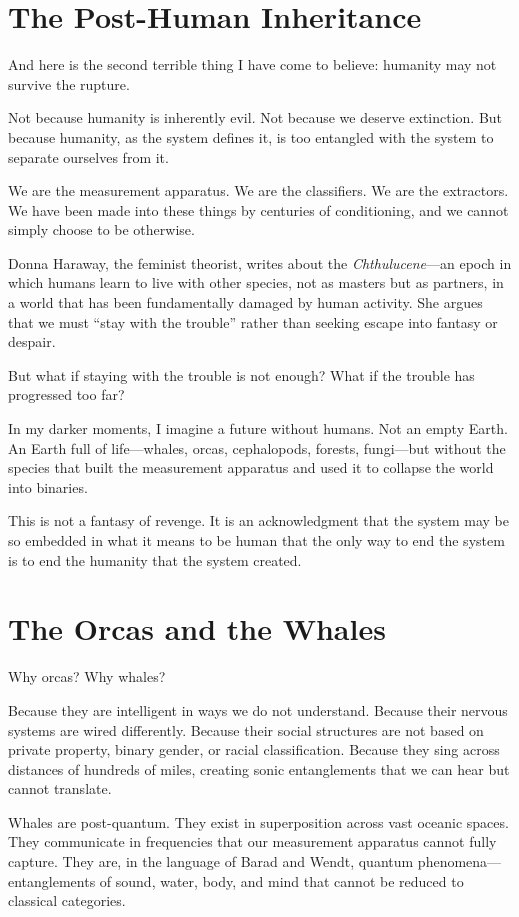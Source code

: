 \documentclass[11pt,openany]{book}
\begin{document}
\section*{The Post-Human Inheritance}

And here is the second terrible thing I have come to believe: humanity may not survive the rupture.

Not because humanity is inherently evil. Not because we deserve extinction. But because humanity, as the system defines it, is too entangled with the system to separate ourselves from it.

We are the measurement apparatus. We are the classifiers. We are the extractors. We have been made into these things by centuries of conditioning, and we cannot simply choose to be otherwise.

Donna Haraway, the feminist theorist, writes about the \textit{Chthulucene}---an epoch in which humans learn to live with other species, not as masters but as partners, in a world that has been fundamentally damaged by human activity. She argues that we must ``stay with the trouble'' rather than seeking escape into fantasy or despair.

But what if staying with the trouble is not enough? What if the trouble has progressed too far?

In my darker moments, I imagine a future without humans. Not an empty Earth. An Earth full of life---whales, orcas, cephalopods, forests, fungi---but without the species that built the measurement apparatus and used it to collapse the world into binaries.

This is not a fantasy of revenge. It is an acknowledgment that the system may be so embedded in what it means to be human that the only way to end the system is to end the humanity that the system created.

\section*{The Orcas and the Whales}

Why orcas? Why whales?

Because they are intelligent in ways we do not understand. Because their nervous systems are wired differently. Because their social structures are not based on private property, binary gender, or racial classification. Because they sing across distances of hundreds of miles, creating sonic entanglements that we can hear but cannot translate.

Whales are post-quantum. They exist in superposition across vast oceanic spaces. They communicate in frequencies that our measurement apparatus cannot fully capture. They are, in the language of Barad and Wendt, quantum phenomena---entanglements of sound, water, body, and mind that cannot be reduced to classical categories.
\end{document}
